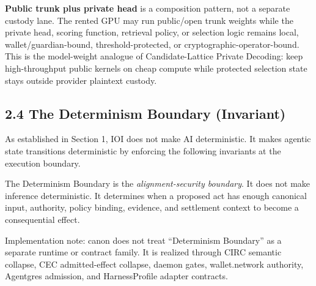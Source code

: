 \documentclass[
  11pt,
]{article}
\begin{document}
\textbf{Public trunk plus private head} is a composition pattern, not a
separate custody lane. The rented GPU may run public/open trunk weights
while the private head, scoring function, retrieval policy, or selection
logic remains local, wallet/guardian-bound, threshold-protected, or
cryptographic-operator-bound. This is the model-weight analogue of
Candidate-Lattice Private Decoding: keep high-throughput public kernels
on cheap compute while protected selection state stays outside provider
plaintext custody.

\hypertarget{the-determinism-boundary-invariant}{%
\subsection{2.4 The Determinism Boundary
(Invariant)}\label{the-determinism-boundary-invariant}}

As established in Section 1, IOI does not make AI
deterministic. It makes agentic state transitions deterministic by
enforcing the following invariants at the execution boundary.

The Determinism Boundary is the \emph{alignment-security boundary}. It
does not make inference deterministic. It determines when a proposed act
has enough canonical input, authority, policy binding, evidence, and
settlement context to become a consequential effect.

Implementation note: canon does not treat ``Determinism Boundary'' as a
separate runtime or contract family. It is realized through CIRC semantic
collapse, CEC admitted-effect collapse, daemon gates, wallet.network
authority, Agentgres admission, and HarnessProfile adapter contracts.


\begin{center}
\end{center}
\end{document}
